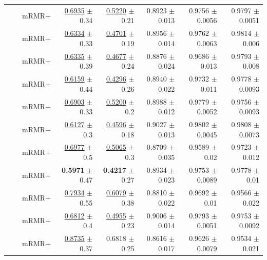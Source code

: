 \begin{longtable}{llp{}rrrrr}
 &  & mRMR+ & \underline{0.6935} {\scriptsize $\pm$ 0.34} & \underline{0.5220} {\scriptsize $\pm$ 0.21} & 0.8923 {\scriptsize $\pm$ 0.013} & 0.9756 {\scriptsize $\pm$ 0.0056} & 0.9797 {\scriptsize $\pm$ 0.0051} \\
 &  & mRMR+ & \underline{0.6334} {\scriptsize $\pm$ 0.33} & \underline{0.4701} {\scriptsize $\pm$ 0.19} & 0.8956 {\scriptsize $\pm$ 0.014} & 0.9762 {\scriptsize $\pm$ 0.0063} & 0.9814 {\scriptsize $\pm$ 0.006} \\
 &  & mRMR+ & \underline{0.6335} {\scriptsize $\pm$ 0.39} & \underline{0.4677} {\scriptsize $\pm$ 0.24} & 0.8876 {\scriptsize $\pm$ 0.024} & 0.9686 {\scriptsize $\pm$ 0.013} & 0.9793 {\scriptsize $\pm$ 0.008} \\
 &  & mRMR+ & \underline{0.6159} {\scriptsize $\pm$ 0.44} & \underline{0.4296} {\scriptsize $\pm$ 0.26} & 0.8940 {\scriptsize $\pm$ 0.022} & 0.9732 {\scriptsize $\pm$ 0.011} & 0.9778 {\scriptsize $\pm$ 0.0093} \\
 &  & mRMR+ & \underline{0.6903} {\scriptsize $\pm$ 0.33} & \underline{0.5200} {\scriptsize $\pm$ 0.2} & 0.8988 {\scriptsize $\pm$ 0.012} & 0.9779 {\scriptsize $\pm$ 0.0052} & 0.9756 {\scriptsize $\pm$ 0.0093} \\
 &  & mRMR+ & \underline{0.6127} {\scriptsize $\pm$ 0.3} & \underline{0.4596} {\scriptsize $\pm$ 0.18} & 0.9027 {\scriptsize $\pm$ 0.013} & 0.9802 {\scriptsize $\pm$ 0.0045} & 0.9808 {\scriptsize $\pm$ 0.0073} \\
 &  & mRMR+ & \underline{0.6977} {\scriptsize $\pm$ 0.5} & \underline{0.5065} {\scriptsize $\pm$ 0.3} & 0.8709 {\scriptsize $\pm$ 0.035} & 0.9589 {\scriptsize $\pm$ 0.02} & 0.9723 {\scriptsize $\pm$ 0.012} \\
 &  & mRMR+ & \textbf{0.5971} {\scriptsize $\pm$ 0.47} & \textbf{0.4217} {\scriptsize $\pm$ 0.27} & 0.8934 {\scriptsize $\pm$ 0.023} & 0.9753 {\scriptsize $\pm$ 0.0089} & 0.9778 {\scriptsize $\pm$ 0.01} \\
 &  & mRMR+ & \underline{0.7934} {\scriptsize $\pm$ 0.55} & \underline{0.6079} {\scriptsize $\pm$ 0.38} & 0.8810 {\scriptsize $\pm$ 0.022} & 0.9692 {\scriptsize $\pm$ 0.01} & 0.9566 {\scriptsize $\pm$ 0.022} \\
 &  & mRMR+ & \underline{0.6812} {\scriptsize $\pm$ 0.4} & \underline{0.4955} {\scriptsize $\pm$ 0.23} & 0.9006 {\scriptsize $\pm$ 0.014} & 0.9793 {\scriptsize $\pm$ 0.0051} & 0.9753 {\scriptsize $\pm$ 0.0092} \\
 &  & mRMR+ & \underline{0.8735} {\scriptsize $\pm$ 0.37} & 0.6818 {\scriptsize $\pm$ 0.25} & 0.8616 {\scriptsize $\pm$ 0.017} & 0.9626 {\scriptsize $\pm$ 0.0079} & 0.9534 {\scriptsize $\pm$ 0.021} \\

\end{longtable}

